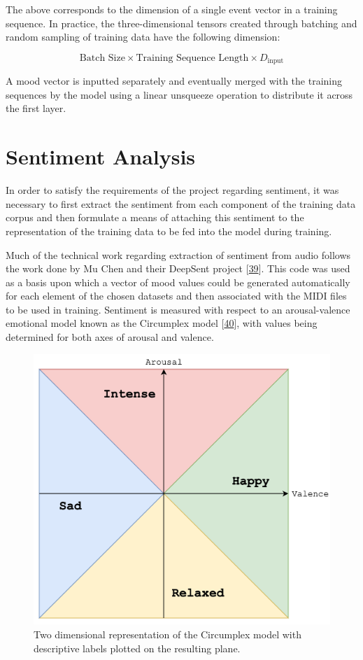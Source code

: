 \documentclass[12pt,]{article}
\begin{document}
The above corresponds to the dimension of a single event vector in a
training sequence. In practice, the three-dimensional tensors created
through batching and random sampling of training data have the following
dimension:

\[\text{Batch Size} \times \text{Training Sequence Length} \times D_{\text{input}}\]

A mood vector is inputted separately and eventually merged with the
training sequences by the model using a linear unsqueeze operation to
distribute it across the first layer.

\hypertarget{sentiment-analysis}{%
\section{Sentiment Analysis}\label{sentiment-analysis}}

In order to satisfy the requirements of the project regarding sentiment,
it was necessary to first extract the sentiment from each component of
the training data corpus and then formulate a means of attaching this
sentiment to the representation of the training data to be fed into the
model during training.

Much of the technical work regarding extraction of sentiment from audio
follows the work done by Mu Chen and their DeepSent project
{[}\protect\hyperlink{ref-deepsent}{39}{]}. This code was used as a
basis upon which a vector of mood values could be generated
automatically for each element of the chosen datasets and then
associated with the MIDI files to be used in training. Sentiment is
measured with respect to an arousal-valence emotional model known as the
Circumplex model
{[}\protect\hyperlink{ref-russell1980circumplex}{40}{]}, with values
being determined for both axes of arousal and valence.

\begin{figure}
\centering
\includegraphics{Images/circumplex.png}
\caption{Two dimensional representation of the Circumplex model with
descriptive labels plotted on the resulting plane.}
\end{figure}
\end{document}
